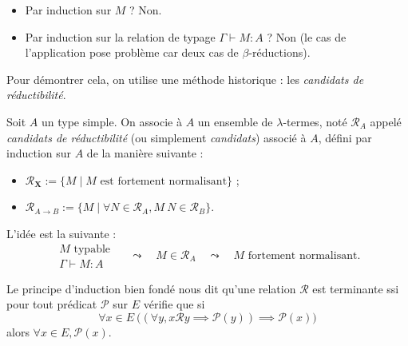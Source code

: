 \documentclass[./main]{subfiles}
\begin{document}
  \begin{rmk}
    \begin{itemize}
      \item Par induction sur $M$ ? Non.
      \item Par induction sur la relation de typage $\Gamma \vdash M : A$ ? Non (le cas de l'application pose problème car deux cas de $\beta$-réductions).
    \end{itemize}
  \end{rmk}
  Pour démontrer cela, on utilise une méthode historique : les \textit{candidats de réductibilité}.
  \begin{defn}
    Soit $A$ un type simple.
    On associe à $A$ un ensemble de $\lambda$-termes, noté $\mathcal{R}_A$ appelé \textit{candidats de réductibilité} (ou simplement \textit{candidats}) associé à $A$, défini par induction sur $A$ de la manière suivante :
    \begin{itemize}
      \item $\mathcal{R}_{\boldsymbol{X}} := \{M  \mid M \text{ est fortement normalisant}\}$ ;
      \item $\mathcal{R}_{A \to B} := \{M  \mid \forall N \in \mathcal{R}_A, M\: N \in \mathcal{R}_B\}$.
    \end{itemize}
  \end{defn}

  L'idée est la suivante : \[
  \begin{array}{c}
    M \text{ typable }\\
    \Gamma \vdash M : A
  \end{array} \quad\leadsto\quad M \in \mathcal{R}_A \quad\leadsto\quad M \text{ fortement normalisant}
  .\]

  \begin{rmk}
    Le principe d'induction bien fondé nous dit qu'une relation $\mathcal{R}$ est terminante ssi pour tout prédicat $\mathcal{P}$ sur $E$ vérifie que si \[
      \forall x \in E \: \big((\forall y, x \mathrel{\mathcal{R}} y \implies \mathcal{P}(y)) \implies \mathcal{P}(x)\big)
    \]
    alors $\forall x \in E, \mathcal{P}(x)$.
  \end{rmk}
\end{document}

